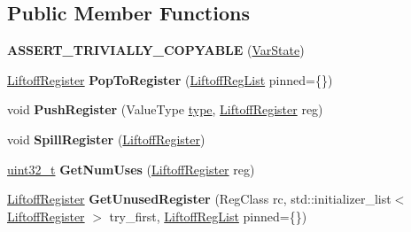 \subsection*{Public Member Functions}
\begin{DoxyCompactItemize}
\item 
\mbox{\label{classv8_1_1internal_1_1wasm_1_1LiftoffAssembler_ad17aac79709ba48bcb3083ce636368ea}} 
{\bfseries A\+S\+S\+E\+R\+T\+\_\+\+T\+R\+I\+V\+I\+A\+L\+L\+Y\+\_\+\+C\+O\+P\+Y\+A\+B\+LE} (\mbox{\hyperlink{classv8_1_1internal_1_1wasm_1_1LiftoffAssembler_1_1VarState}{Var\+State}})
\item 
\mbox{\label{classv8_1_1internal_1_1wasm_1_1LiftoffAssembler_a28f28d4c4d0b1370f0e772ca12fe0f07}} 
\mbox{\hyperlink{classv8_1_1internal_1_1wasm_1_1LiftoffRegister}{Liftoff\+Register}} {\bfseries Pop\+To\+Register} (\mbox{\hyperlink{classv8_1_1internal_1_1wasm_1_1LiftoffRegList}{Liftoff\+Reg\+List}} pinned=\{\})
\item 
\mbox{\label{classv8_1_1internal_1_1wasm_1_1LiftoffAssembler_a08cfaeb35662999886414a088f31442d}} 
void {\bfseries Push\+Register} (Value\+Type \mbox{\hyperlink{classstd_1_1conditional_1_1type}{type}}, \mbox{\hyperlink{classv8_1_1internal_1_1wasm_1_1LiftoffRegister}{Liftoff\+Register}} reg)
\item 
\mbox{\label{classv8_1_1internal_1_1wasm_1_1LiftoffAssembler_af9675ebf98bb42baa8db2c785e75135f}} 
void {\bfseries Spill\+Register} (\mbox{\hyperlink{classv8_1_1internal_1_1wasm_1_1LiftoffRegister}{Liftoff\+Register}})
\item 
\mbox{\label{classv8_1_1internal_1_1wasm_1_1LiftoffAssembler_aed73f8bfd50d306cc889b876775703ee}} 
\mbox{\hyperlink{classuint32__t}{uint32\+\_\+t}} {\bfseries Get\+Num\+Uses} (\mbox{\hyperlink{classv8_1_1internal_1_1wasm_1_1LiftoffRegister}{Liftoff\+Register}} reg)
\item 
\mbox{\label{classv8_1_1internal_1_1wasm_1_1LiftoffAssembler_a931725f44402c9973b43498572fe9c48}} 
\mbox{\hyperlink{classv8_1_1internal_1_1wasm_1_1LiftoffRegister}{Liftoff\+Register}} {\bfseries Get\+Unused\+Register} (Reg\+Class rc, std\+::initializer\+\_\+list$<$ \mbox{\hyperlink{classv8_1_1internal_1_1wasm_1_1LiftoffRegister}{Liftoff\+Register}} $>$ try\+\_\+first, \mbox{\hyperlink{classv8_1_1internal_1_1wasm_1_1LiftoffRegList}{Liftoff\+Reg\+List}} pinned=\{\})

\end{DoxyCompactItemize}
